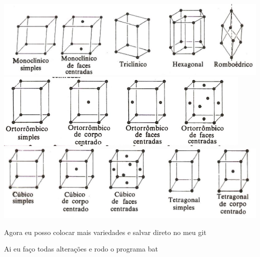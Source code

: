  \includegraphics[scale=0.5,trim={0 0 0 0}]{figures/var1}
 \includegraphics[scale=0.45,trim={0 0 0 0}]{figures/var2}
 \includegraphics[scale=0.5,trim={0 0 0 0}]{figures/var3}



Agora eu posso colocar mais variedades e salvar direto no meu git

Ai eu faço todas alterações e rodo o programa bat


